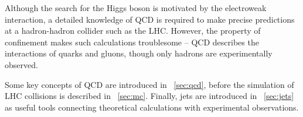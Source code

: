 
Although the search for the Higgs boson is motivated by the electroweak interaction, a
detailed knowledge of \ac{QCD} is required to make precise predictions at a hadron-hadron
collider such as the LHC. However, the property of confinement makes such 
calculations troublesome -- \ac{QCD} describes the interactions of quarks and gluons, 
though only hadrons are experimentally observed.

Some key concepts of \ac{QCD} are introduced in \Section~\ref{sec:qcd}, before the 
simulation of LHC collisions is described in \Section~\ref{sec:mc}. Finally, jets are 
introduced in \Section~\ref{sec:jets} as useful tools connecting theoretical calculations 
with experimental observations.
